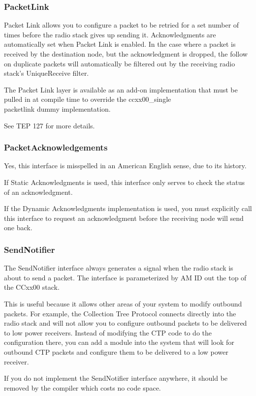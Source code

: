\documentclass{article}
\begin{document}
\subsubsection{PacketLink}
Packet Link allows you to configure a packet to be retried for a set number of times before
the radio stack gives up sending it. Acknowledgments are automatically set when Packet Link
is enabled. In the case where a packet is received by the destination node, but the acknowledgment
is dropped, the follow on duplicate packets will automatically be filtered out by the receiving 
radio stack's UniqueReceive filter.

The Packet Link layer is available as an add-on implementation that must be pulled in at compile time to
override the ccxx00\_single\\packetlink dummy implementation.

See TEP 127 \cite{tep127} for more details.

\subsubsection{PacketAcknowledgements}
Yes, this interface is misspelled in an American English sense, due to its history. 

If Static Acknowledgments is used, this interface only serves to check the status of
an acknowledgment.  

If the Dynamic Acknowledgments implementation is used, you must explicitly call this 
interface to request an acknowledgment before the receiving node will send one back.

\subsubsection{SendNotifier}
The SendNotifier interface always generates a signal when the radio stack is about to send
a packet. The interface is parameterized by AM ID out the top of the CCxx00 stack. 

This is useful because it allows other areas of your system to modify outbound packets. 
For example, the Collection Tree Protocol connects directly into the radio stack and will not allow you
to configure outbound packets to be delivered to low power receivers. Instead of modifying
the CTP code to do the configuration there, you can add a module into the system that will
look for outbound CTP packets and configure them to be delivered to a low power receiver.

If you do not implement the SendNotifier interface anywhere, it should be removed by the
compiler which costs no code space.
\end{document}
